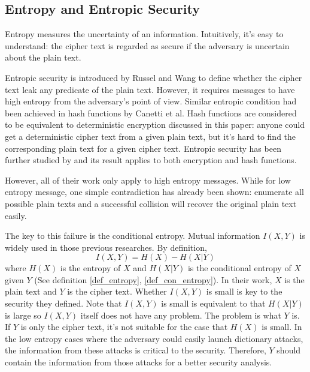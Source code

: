 \documentclass[10pt, conference, compsocconf]{IEEEtran}
\begin{document}
    \subsection{Entropy and Entropic Security}
    Entropy\cite{entropy} measures the uncertainty of an information. Intuitively, it's easy to
    understand: the cipher text is regarded as secure
    if the adversary is uncertain about the plain text.

    Entropic security is introduced by Russel and Wang\cite{Russel02howto} to define
    whether the cipher text leak any predicate of the plain text. However,
    it requires messages to have high entropy from
    the adversary's point of view. Similar entropic condition had been
    achieved in hash functions by Canetti et al\cite{Canetti97towardsrealizing, Canetti_perfectlyone-way}.
    Hash functions are
    considered to be equivalent to deterministic encryption discussed in this
    paper: anyone could get a deterministic cipher text from a
    given plain text, but it's hard to find the corresponding plain text
    for a given cipher text. Entropic security has been further
    studied by \cite{entropic_wang}
    and its result applies to both encryption and hash functions.

    However, all of their work only apply to high entropy messages.
    While for low entropy message,
    one simple contradiction has already been
    shown: enumerate all possible plain texts and a successful collision
    will recover the original plain text easily.

    The key to this failure is the conditional entropy. Mutual information
    $I(X, Y)$ is widely used in those previous researches. By definition,
    \begin{equation}
        I(X, Y) = H(X) - H(X|Y)
    \end{equation}
    where $H(X)$ is the entropy of $X$ and $H(X|Y)$ is the conditional entropy
    of $X$ given $Y$ (See definition \ref{def_entropy}, \ref{def_con_entropy}).
    In their work, $X$ is the plain text and $Y$ is the cipher text.
    Whether $I(X, Y)$ is small is key to the security they defined.
    Note that $I(X, Y)$ is small
    is equivalent to that $H(X|Y)$ is large so $I(X, Y)$ itself does not have any problem.
    The problem is what $Y$ is.
    If $Y$ is only the cipher text, it's not suitable for the case that $H(X)$ is small.
    In the low entropy cases where the adversary could easily launch dictionary attacks,
    the information from these attacks is critical to the security. Therefore, $Y$
    should contain the information from those attacks for a better security analysis.
\end{document}
